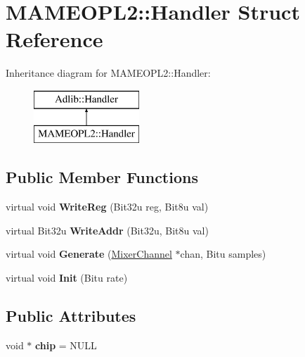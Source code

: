 \hypertarget{structMAMEOPL2_1_1Handler}{\section{M\-A\-M\-E\-O\-P\-L2\-:\-:Handler Struct Reference}
\label{structMAMEOPL2_1_1Handler}
}
Inheritance diagram for M\-A\-M\-E\-O\-P\-L2\-:\-:Handler\-:\begin{figure}[H]
\begin{center}
\leavevmode
\includegraphics[height=2.000000cm]{structMAMEOPL2_1_1Handler}
\end{center}
\end{figure}
\subsection*{Public Member Functions}
\begin{DoxyCompactItemize}
\item 
\hypertarget{structMAMEOPL2_1_1Handler_a9432a798ae5818d012a865b4ec05efbb}{virtual void {\bfseries Write\-Reg} (Bit32u reg, Bit8u val)}\label{structMAMEOPL2_1_1Handler_a9432a798ae5818d012a865b4ec05efbb}

\item 
\hypertarget{structMAMEOPL2_1_1Handler_a697cf8d3aaa763a99ca01c51b193a152}{virtual Bit32u {\bfseries Write\-Addr} (Bit32u, Bit8u val)}\label{structMAMEOPL2_1_1Handler_a697cf8d3aaa763a99ca01c51b193a152}

\item 
\hypertarget{structMAMEOPL2_1_1Handler_a825d60c8d94af76fb466f980725ebe79}{virtual void {\bfseries Generate} (\hyperlink{classMixerChannel}{Mixer\-Channel} $\ast$chan, Bitu samples)}\label{structMAMEOPL2_1_1Handler_a825d60c8d94af76fb466f980725ebe79}

\item 
\hypertarget{structMAMEOPL2_1_1Handler_ae1ae4dd98b7022333e50505a8b36d78f}{virtual void {\bfseries Init} (Bitu rate)}\label{structMAMEOPL2_1_1Handler_ae1ae4dd98b7022333e50505a8b36d78f}

\end{DoxyCompactItemize}
\subsection*{Public Attributes}
\begin{DoxyCompactItemize}
\item 
\hypertarget{structMAMEOPL2_1_1Handler_aaeb8b2c151dadaf5968466398c0baacb}{void $\ast$ {\bfseries chip} = N\-U\-L\-L}\label{structMAMEOPL2_1_1Handler_aaeb8b2c151dadaf5968466398c0baacb}

\end{DoxyCompactItemize}


